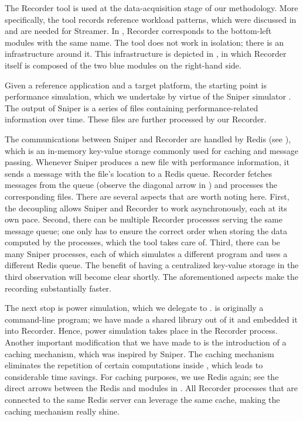 
The Recorder tool is used at the data-acquisition stage of our methodology. More
specifically, the tool records reference workload patterns, which were discussed
in  and are needed for Streamer. In , Recorder
corresponds to the bottom-left modules with the same name. The tool does not
work in isolation; there is an infrastructure around it. This infrastructure is
depicted in , in which Recorder itself is composed of the two
blue modules on the right-hand side.

Given a reference application and a target platform, the starting point is
performance simulation, which we undertake by virtue of the Sniper simulator
\cite{carlson2011}. The output of Sniper is a series of files containing
performance-related information over time. These files are further processed by
our Recorder.

The communications between Sniper and Recorder are handled by Redis \cite{redis}
(see ), which is an in-memory key-value storage commonly used for
caching and message passing. Whenever Sniper produces a new file with
performance information, it sends a message with the file's location to a Redis
queue. Recorder fetches messages from the queue (observe the diagonal arrow in
) and processes the corresponding files. There are several
aspects that are worth noting here. First, the decoupling allows Sniper and
Recorder to work asynchronously, each at its own pace. Second, there can be
multiple Recorder processes serving the same message queue; one only has to
ensure the correct order when storing the data computed by the processes, which
the tool takes care of. Third, there can be many Sniper processes, each of which
simulates a different program and uses a different Redis queue. The benefit of
having a centralized key-value storage in the third observation will become
clear shortly. The aforementioned aspects make the recording substantially
faster.

The next stop is power simulation, which we delegate to 
\cite{li2009}.  is originally a command-line program; we have made a
shared library out of it and embedded it into Recorder. Hence, power simulation
takes place in the Recorder process. Another important modification that we have
made to  is the introduction of a caching mechanism, which was
inspired by Sniper. The caching mechanism eliminates the repetition of certain
computations inside , which leads to considerable time savings. For
caching purposes, we use Redis again; see the direct arrows between the Redis
and  modules in . All Recorder processes that are
connected to the same Redis server can leverage the same cache, making the
caching mechanism really shine.

